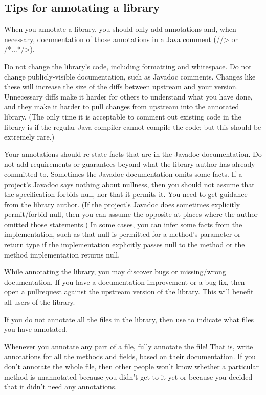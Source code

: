 \subsection{Tips for annotating a library\label{annotating-tips}}

When you annotate a library, you should only add annotations and, when
necessary, documentation of those annotations in a Java comment (\<//>
or \</*...*/>).

Do not change the library's code, including formatting and whitespace.
Do not change publicly-visible documentation, such as Javadoc comments.
Changes like these will increase the size of the diffs
between upstream and your version.  Unnecessary diffs make it harder for
others to understand what you have done, and they make it harder to pull
changes from upstream into the annotated library.
(The only time it is acceptable to comment out existing code in the library
is if the regular Java compiler cannot compile the code; but this should be
extremely rare.)

Your annotations should re-state facts that are in the Javadoc
documentation.  Do not add requirements or guarantees beyond what the
library author has already committed to.  Sometimes the Javadoc
documentation omits some facts.  If a project's Javadoc says nothing about
nullness, then you should not assume that the specification forbids null,
nor that it permits it.  You need to get guidance from the library author.
(If the project's Javadoc does sometimes explicitly permit/forbid null,
then you can assume the opposite at places where the author omitted those
statements.)  In some cases, you can infer some facts from the
implementation, such as that null is permitted for a method's parameter or
return type if the implementation explicitly passes null to the method or
the method implementation returns null.

While annotating the library, you may discover bugs or missing/wrong
documentation.  If you have a documentation improvement or a bug fix, then
open a pullrequest against the upstream version of the library.  This will
benefit all users of the library.

If you do not annotate all the files in the library, then use
 to indicate what files you have
annotated.

Whenever you annotate any part of a file, fully annotate the file!  That
is, write annotations for all the methods and fields, based on their
documentation.  If you don't annotate the whole file, then other people
won't know whether a particular method is unannotated because you didn't
get to it yet or because you decided that it didn't need any annotations.

